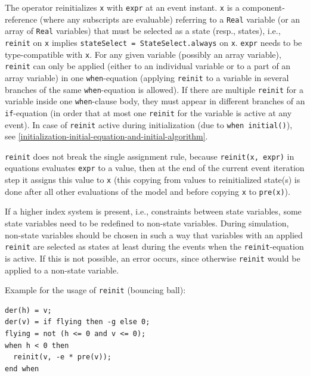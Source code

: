 The operator reinitializes \lstinline!x! with \lstinline!expr! at an event instant.
\lstinline!x! is a component-reference (where any subscripts are evaluable) referring to a \lstinline!Real! variable (or an array of \lstinline!Real! variables) that must be selected as a state (resp., states), i.e., \lstinline!reinit! on \lstinline!x! implies \lstinline!stateSelect = StateSelect.always! on \lstinline!x!.
\lstinline!expr! needs to be type-compatible with \lstinline!x!.
For any given variable (possibly an array variable), \lstinline!reinit! can only be applied (either to an individual variable or to a part of an array variable) in one \lstinline!when!-equation (applying \lstinline!reinit! to a variable in several branches of the same \lstinline!when!-equation is allowed).
If there are multiple \lstinline!reinit! for a variable inside one \lstinline!when!-clause body, they must appear in different branches of an \lstinline!if!-equation (in order that at most one \lstinline!reinit! for the variable is active at any event).
In case of \lstinline!reinit! active during initialization (due to \lstinline!when initial()!), see \cref{initialization-initial-equation-and-initial-algorithm}.

\lstinline!reinit! does not break the single assignment rule, because \lstinline!reinit(x, expr)! in equations evaluates \lstinline!expr! to a value, then at the end of the current event iteration step it assigns this value to \lstinline!x! (this copying from values to reinitialized state(s) is done after all other evaluations of the model and before copying \lstinline!x! to \lstinline!pre(x)!).

\begin{example}
If a higher index system is present, i.e., constraints between state variables, some state variables need to be redefined to non-state variables.
During simulation, non-state variables should be chosen in such a way that variables with an applied \lstinline!reinit! are selected as states at least during the events when the \lstinline!reinit!-equation is active.
If this is not possible, an error occurs, since otherwise \lstinline!reinit! would be applied to a non-state variable.

Example for the usage of \lstinline!reinit! (bouncing ball):
\begin{lstlisting}[language=modelica]
der(h) = v;
der(v) = if flying then -g else 0;
flying = not (h <= 0 and v <= 0);
when h < 0 then
  reinit(v, -e * pre(v));
end when
\end{lstlisting}
\end{example}


